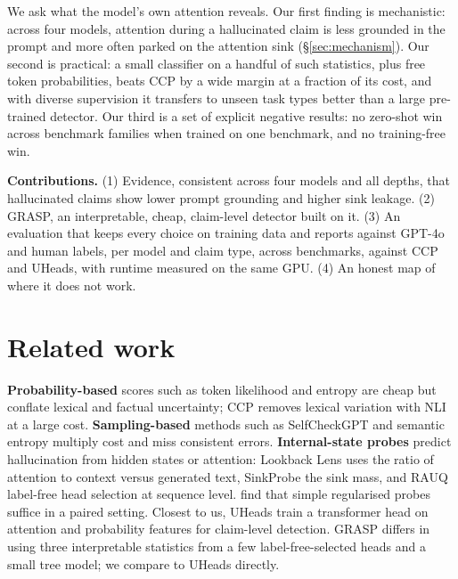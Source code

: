 \documentclass[11pt]{article}
\begin{document}
We ask what the model's own attention reveals. Our first finding is mechanistic: across four
models, attention during a hallucinated claim is less grounded in the prompt and more often parked
on the attention sink (\S\ref{sec:mechanism}). Our second is practical: a small classifier on a
handful of such statistics, plus free token probabilities, beats CCP by a wide margin at a fraction
of its cost, and with diverse supervision it transfers to unseen task types better than a large
pre-trained detector. Our third is a set of explicit negative results: no zero-shot win across
benchmark families when trained on one benchmark, and no training-free win.

\textbf{Contributions.} (1) Evidence, consistent across four models and all depths, that hallucinated
claims show lower prompt grounding and higher sink leakage. (2) GRASP, an interpretable, cheap,
claim-level detector built on it. (3) An evaluation that keeps every choice on training data and
reports against GPT-4o and human labels, per model and claim type, across benchmarks, against CCP
and UHeads, with runtime measured on the same GPU. (4) An honest map of where it does not work.

\section{Related work}
\textbf{Probability-based} scores such as token likelihood and entropy are cheap but conflate lexical
and factual uncertainty; CCP \citep{fadeeva-etal-2024-fact} removes lexical variation with NLI at a
large cost. \textbf{Sampling-based} methods such as SelfCheckGPT \citep{manakul-etal-2023-selfcheckgpt}
and semantic entropy \citep{kuhn2023semanticuncertaintylinguisticinvariances} multiply cost and
miss consistent errors. \textbf{Internal-state probes} predict hallucination from hidden states
\citep{azaria2023internalstatellmknows,chen2024insidellmsinternalstates} or attention: Lookback
Lens \citep{chuang2024lookbacklensdetectingmitigating} uses the ratio of attention to context versus
generated text, SinkProbe \citep{binkowski2026attentionsinksinternalsignals} the sink mass, and RAUQ
\citep{vazhentsev2026efficienthallucinationdetectionllms} label-free head selection at sequence level.
\citet{lee2026meanshift} find that simple regularised probes suffice in a paired setting. Closest to
us, UHeads \citep{shelmanov-etal-2025-head} train a transformer head on attention and probability
features for claim-level detection. GRASP differs in using three interpretable statistics from a few
label-free-selected heads and a small tree model; we compare to UHeads directly.
\end{document}
